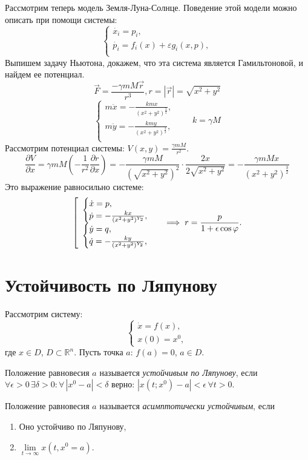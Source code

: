 \begin{example}
	Рассмотрим теперь модель Земля-Луна-Солнце. Поведение этой модели можно описать при помощи системы:
	$$
		\begin{cases}
			\dot{x_i}=p_i,\\
			\dot{p_i}=f_i(x)+\varepsilon g_i(x{,} p),\\
		\end{cases}
	$$
	Выпишем задачу Ньютона, докажем, что эта система является Гамильтоновой, и найдем ее потенциал.
	$$
		\overrightarrow{F}=\frac{-\gamma mM\overrightarrow{r}}{r^3}, r=|\overrightarrow{r}|=\sqrt{x^2+y^2}
	$$
	$$
		\begin{cases}
			m\ddot{x}=-\frac{kmx}{(x^2+y^2)^\frac{3}{2}},\\ 
			m\ddot{y}=-\frac{kmy}{(x^2+y^2)^\frac{3}{2}},\\
		\end{cases}
		\qquad k=\gamma M
	$$
	Рассмотрим потенциал системы: $V(x,y) =\frac{\gamma mM}{r^2}$.
	$$
		\frac{\partial V}{\partial x}=\gamma mM(-\frac{1}{r^2}\frac{\partial r}{\partial x})=-\frac{\gamma mM}{(\sqrt{x^2+y^2})^2}\cdot \frac{2x}{2\sqrt{x^2+y^2}}=-\frac{\gamma mMx}{(x^2+y^2)^\frac{3}{2}}
	$$
	Это выражение равносильно системе:
	$$
	\left[
	\begin{array}{ll}
		\begin{cases}
			\dot{x}=p, \\
			\dot{p}=-\frac{kx}{(x^2+y^2)^{Y_2}}, \\
		\end{cases}\\
		\begin{cases}
			\dot{y}=q, \\
			\dot{q}=-\frac{ky}{(x^2+y^2)^{Y_2}},\\
		\end{cases}
	\end{array}
	\right. \implies r=\frac{p}{1+\epsilon \cos \varphi}.\\
$$
\end{example}



\section{Устойчивость по Ляпунову}
Рассмотрим систему:
$$
	\begin{cases}
		\dot x =  f(x),\\
		x(0) = x^0,
	\end{cases}
$$
где $x \in D$, $D \subset \mathbb{R}^n$. Пусть точка $a$: $f(a) = 0$, $a \in D$.
\begin{definition}
	Положение равновесия $a$ называется \textit{устойчивым по Ляпунову}, если $\forall \epsilon > 0 \,\exists \delta > 0: \forall \, |x^0-a|< \delta$ верно:  $|x(t;x^0)-a| < \epsilon\, \forall t>0$.
\end{definition}

\begin{definition}
	Положение равновесия $a$ называется \textit{асимптотически устойчивым}, если 
	\begin{enumerate}
		\item Оно устойчиво по Ляпунову,
		\item $\lim\limits_{t\rightarrow \infty} x(t, x^0 = a)$.
	\end{enumerate}
\end{definition}
